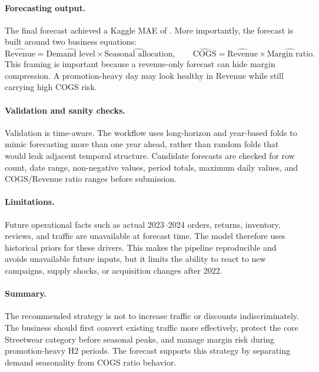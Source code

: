 \paragraph{Forecasting output.}
The final forecast achieved a Kaggle MAE of . More importantly, the forecast is built around two business equations:
\[
  \widehat{\text{Revenue}} =
  \widehat{\text{Demand level}}
  \times
  \widehat{\text{Seasonal allocation}},
  \qquad
  \widehat{\text{COGS}} =
  \widehat{\text{Revenue}}
  \times
  \widehat{\text{Margin ratio}}.
\]
This framing is important because a revenue-only forecast can hide margin compression. A promotion-heavy day may look healthy in Revenue while still carrying high COGS risk.

\paragraph{Validation and sanity checks.}
Validation is time-aware. The workflow uses long-horizon and year-based folds to mimic forecasting more than one year ahead, rather than random folds that would leak adjacent temporal structure. Candidate forecasts are checked for row count, date range, non-negative values, period totals, maximum daily values, and COGS/Revenue ratio ranges before submission.

\paragraph{Limitations.}
Future operational facts such as actual 2023--2024 orders, returns, inventory, reviews, and traffic are unavailable at forecast time. The model therefore uses historical priors for these drivers. This makes the pipeline reproducible and avoids unavailable future inputs, but it limits the ability to react to new campaigns, supply shocks, or acquisition changes after 2022.

\paragraph{Summary.}
The recommended strategy is not to increase traffic or discounts indiscriminately. The business should first convert existing traffic more effectively, protect the core Streetwear category before seasonal peaks, and manage margin risk during promotion-heavy H2 periods. The forecast supports this strategy by separating demand seasonality from COGS ratio behavior.
